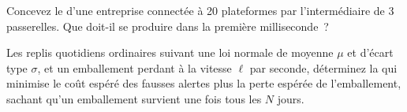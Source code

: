 \begin{interviewq}\label{iq:hf:risk-controls:5}
Concevez le  d'une entreprise connectée à 20 plateformes par l'intermédiaire de 3 passerelles. Que doit-il se produire dans la première milliseconde~?
\end{interviewq}

\begin{interviewq}\label{iq:hf:risk-controls:6}
Les replis quotidiens ordinaires suivant une loi normale de moyenne $\mu$ et d'écart type $\sigma$, et un emballement perdant à la vitesse $\ell$ par seconde, déterminez la 
qui minimise le coût espéré des fausses alertes plus la perte espérée de l'emballement, sachant qu'un emballement survient une fois tous les $N$ jours.
\end{interviewq}
